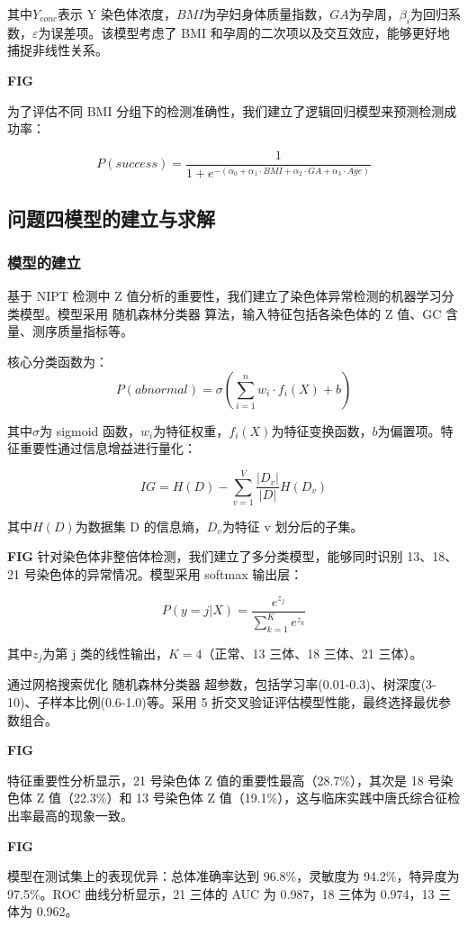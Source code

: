 \documentclass[withoutpreface,bwprint]{cumcmthesis} %
\begin{document}
其中$Y_{conc}$表示 Y 染色体浓度，$BMI$为孕妇身体质量指数，$GA$为孕周，$\beta_i$为回归系数，$\varepsilon$为误差项。该模型考虑了 BMI 和孕周的二次项以及交互效应，能够更好地捕捉非线性关系。

\textbf{FIG}

为了评估不同 BMI 分组下的检测准确性，我们建立了逻辑回归模型来预测检测成功率：

$$P(success) = \frac{1}{1 + e^{-(\alpha_0 + \alpha_1 \cdot BMI + \alpha_2 \cdot GA + \alpha_3 \cdot Age)}}$$

\subsection{问题四模型的建立与求解}
\subsubsection{模型的建立}

基于 NIPT 检测中 Z 值分析的重要性，我们建立了染色体异常检测的机器学习分类模型。模型采用 随机森林分类器 算法，输入特征包括各染色体的 Z 值、GC 含量、测序质量指标等。

核心分类函数为：
$$P(abnormal) = \sigma(\sum_{i=1}^{n} w_i \cdot f_i(X) + b)$$

其中$\sigma$为 sigmoid 函数，$w_i$为特征权重，$f_i(X)$为特征变换函数，$b$为偏置项。特征重要性通过信息增益进行量化：

$$IG = H(D) - \sum_{v=1}^{V} \frac{|D_v|}{|D|} H(D_v)$$

其中$H(D)$为数据集 D 的信息熵，$D_v$为特征 v 划分后的子集。

\textbf{FIG}
针对染色体非整倍体检测，我们建立了多分类模型，能够同时识别 13、18、21 号染色体的异常情况。模型采用 softmax 输出层：

$$P(y=j|X) = \frac{e^{z_j}}{\sum_{k=1}^{K} e^{z_k}}$$

其中$z_j$为第 j 类的线性输出，$K=4$（正常、13 三体、18 三体、21 三体）。

通过网格搜索优化 随机森林分类器 超参数，包括学习率(0.01-0.3)、树深度(3-10)、子样本比例(0.6-1.0)等。采用 5 折交叉验证评估模型性能，最终选择最优参数组合。

\textbf{FIG}

特征重要性分析显示，21 号染色体 Z 值的重要性最高（28.7\%），其次是 18 号染色体 Z 值（22.3\%）和 13 号染色体 Z 值（19.1\%），这与临床实践中唐氏综合征检出率最高的现象一致。

\textbf{FIG}

模型在测试集上的表现优异：总体准确率达到 96.8\%，灵敏度为 94.2\%，特异度为 97.5\%。ROC 曲线分析显示，21 三体的 AUC 为 0.987，18 三体为 0.974，13 三体为 0.962。
\end{document}
